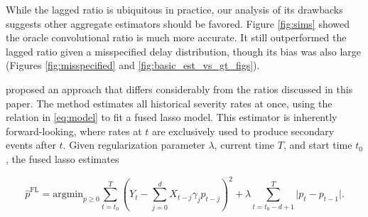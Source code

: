\documentclass{article}
\renewcommand{\hat}{\widehat} %
\begin{document}
While the lagged ratio is ubiquitous in practice, our analysis of its
drawbacks suggests other aggregate estimators should be favored. Figure
\ref{fig:sims} showed the oracle convolutional ratio is much more
accurate. 
It still outperformed the lagged ratio given a misspecified delay distribution, though its bias was also large (Figures \ref{fig:misspecified} and \ref{fig:basic_est_vs_gt_figs}).




\citet{fusedlasso} proposed an approach that differs considerably from the ratios discussed in this paper. 
The method estimates all historical severity rates at once, using the relation in \eqref{eq:model} to fit a fused lasso model. This estimator is inherently forward-looking, where rates at $t$ are exclusively used to produce secondary events after $t$. Given regularization parameter $\lambda$, current time $T$, and start time $t_0$, the fused lasso estimates

$$\hat{p}^\text{FL} = \text{argmin}_{p \geq 0} \sum_{t=t_0}^T (Y_t-\sum_{j=0}^d X_{t-j}\gamma_j p_{t-j})^2 + \lambda\sum_{t=t_0-d+1}^{T}\lvert p_t - p_{t-1}\rvert.$$
\end{document}
